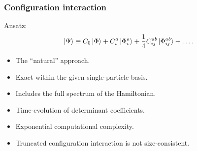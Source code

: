 \documentclass{beamer}
\begin{document}
\begin{frame}
    \frametitle{Configuration interaction}
    Ansatz:
    \begin{align}
        \ket*{\Psi} \equiv C_0\ket*{\Phi}
        + C^{a}_{i}\ket*{\Phi^{a}_{i}}
        + \frac{1}{4}C^{ab}_{ij}\ket*{\Phi^{ab}_{ij}}
        + \dots.
    \end{align}
    \begin{itemize}
        \item The ``natural'' approach.
        \item Exact within the given single-particle basis.
        \item Includes the full spectrum of the Hamiltonian.
        \item Time-evolution of determinant coefficients.
        \item Exponential computational complexity.
        \item Truncated configuration interaction is not size-consistent.
    \end{itemize}
\end{frame}

%
%
%
%
\end{document}
